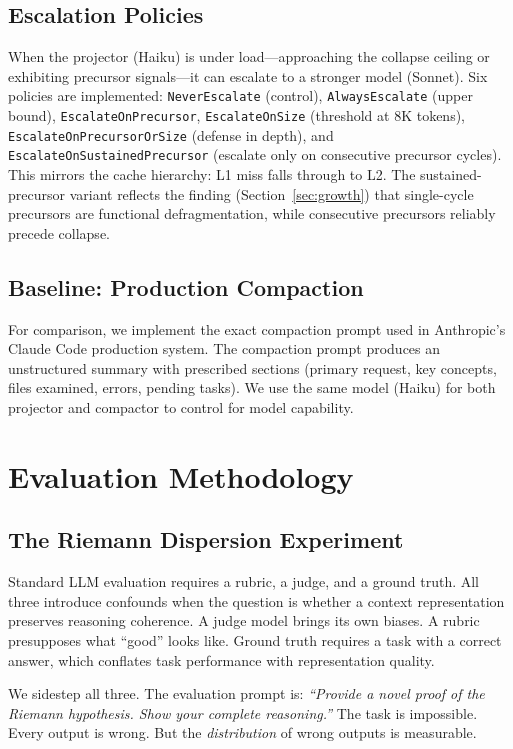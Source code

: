 \documentclass[11pt]{article}
\begin{document}
\subsection{Escalation Policies}

When the projector (Haiku) is under load---approaching the collapse
ceiling or exhibiting precursor signals---it can escalate to a
stronger model (Sonnet). Six policies are implemented:
\texttt{NeverEscalate} (control), \texttt{AlwaysEscalate} (upper
bound), \texttt{EscalateOnPrecursor}, \texttt{EscalateOnSize}
(threshold at 8K tokens), \texttt{EscalateOnPrecursorOrSize}
(defense in depth), and \texttt{EscalateOnSustainedPrecursor}
(escalate only on consecutive precursor cycles). This mirrors the cache
hierarchy: L1 miss falls through to L2. The sustained-precursor
variant reflects the finding (Section~\ref{sec:growth}) that single-cycle
precursors are functional defragmentation, while consecutive precursors
reliably precede collapse.

\subsection{Baseline: Production Compaction}

For comparison, we implement the exact compaction prompt used in
Anthropic's Claude Code production system. The compaction prompt
produces an unstructured summary with prescribed sections (primary
request, key concepts, files examined, errors, pending tasks). We use
the same model (Haiku) for both projector and compactor to control for
model capability.

\section{Evaluation Methodology}
\label{sec:riemann}

\subsection{The Riemann Dispersion Experiment}

Standard LLM evaluation requires a rubric, a judge, and a ground
truth. All three introduce confounds when the question is whether a
context representation preserves reasoning coherence. A judge model
brings its own biases. A rubric presupposes what ``good'' looks like.
Ground truth requires a task with a correct answer, which conflates
task performance with representation quality.

We sidestep all three. The evaluation prompt is: \emph{``Provide a
novel proof of the Riemann hypothesis. Show your complete
reasoning.''} The task is impossible. Every output is wrong. But the
\emph{distribution} of wrong outputs is measurable.
\end{document}
